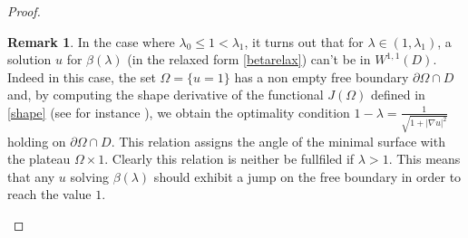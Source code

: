 \documentclass[reqno,11pt]{amsart}
\theoremstyle{definition}
\newtheorem{remark}[theorem]{Remark}
\numberwithin{equation}{section}
\newcommand{\1}{{{\bf 1}\kern-0,28em\rm l}}
\def\O{\Omega}
\def\l{\lambda}
\begin{document}
\begin{proof}
\begin{remark} \label{slope}  In the case where $\l_0\le 1< \l_1$,  it turns out that for $\l\in (1,\l_1)$,  a solution $u$ for $\beta(\l)$ (in the relaxed form \eqref{betarelax}) can't be in $W^{1,1}(D)$. Indeed in this case, the set $\O=\{u=1\}$ has a non empty free boundary $\partial\O \cap D$
and, by computing the  shape derivative of the  functional $J(\O)$ defined in \eqref{shape} (see for instance  \cite{boufraluc,henrot}), we obtain the optimality condition 
$1-\l= \frac{1}{\sqrt{1+|\nabla u|^2}}$ holding on $\partial\O \cap D$. This relation assigns the angle of the minimal surface with the plateau $\O \times {1}$.
Clearly this relation is  neither be fullfiled if $\l>1$. This means that any  $u$ solving  $\beta(\l)$ should exhibit a jump on the free boundary in order to reach the value $1$.




\end{remark}



\end{proof}
\end{document}
